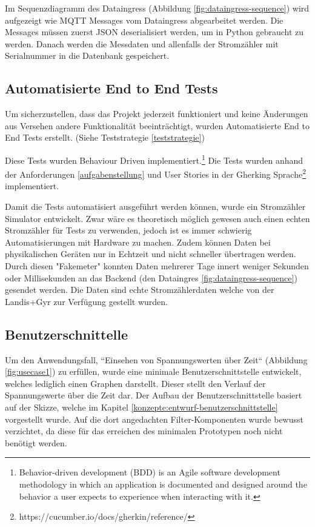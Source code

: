 Im Sequenzdiagramm des Dataingress (Abbildung \ref{fig:dataingress-sequence}) wird aufgezeigt
wie \ac{MQTT} Messages vom Dataingress abgearbeitet werden.
Die Messages müssen zuerst \ac{JSON} deserialisiert werden, um in Python
gebraucht zu werden. Danach werden die Messdaten und allenfalls der
Stromzähler mit Serialnummer in die Datenbank gespeichert.

\subsection{Automatisierte End to End Tests}

Um sicherzustellen, dass das Projekt jederzeit funktioniert und keine Änderungen
aus Versehen andere Funktionalität beeinträchtigt, wurden Automatisierte
End to End Tests erstellt. (Siehe Teststrategie \ref{teststrategie})

Diese Tests wurden Behaviour Driven implementiert.\footnote{
    Behavior-driven development (BDD) is an Agile software development methodology
    in which an application is documented and designed around the behavior a user
    expects to experience when interacting with it.
}\parencite{what_is_bdd} Die Tests wurden anhand der Anforderungen \ref{aufgabenstellung}
und User Stories in der Gherking Sprache\footnote{https://cucumber.io/docs/gherkin/reference/} implementiert.

Damit die Tests automatisiert ausgeführt werden können, wurde ein Stromzähler Simulator entwickelt.
Zwar wäre es theoretisch möglich gewesen auch einen echten Stromzähler für Tests zu verwenden,
jedoch ist es immer schwierig Automatisierungen mit Hardware zu machen. Zudem können
Daten bei physikalischen Geräten nur in Echtzeit und nicht schneller übertragen werden.
Durch diesen "Fakemeter" konnten Daten mehrerer Tage innert weniger Sekunden oder Millisekunden
an das Backend (den Dataingres \ref{fig:dataingress-sequence}) gesendet werden.
Die Daten sind echte Stromzählerdaten welche von der Landis+Gyr zur Verfügung
gestellt wurden.

\subsection{Benutzerschnittelle}
Um den Anwendungsfall, ``Einsehen von Spannungswerten über Zeit`` (Abbildung \ref{fig:usecase1}) zu erfüllen,
wurde eine minimale Benutzerschnittstelle entwickelt, welches lediglich einen Graphen darstellt.
Dieser stellt den Verlauf der Spannungswerte über die Zeit dar.
Der Aufbau der Benutzerschnittstelle basiert auf der Skizze,
welche im Kapitel \ref{konzepte:entwurf-benutzerschnittstelle} vorgestellt wurde.
Auf die dort angedachten Filter-Komponenten wurde bewusst verzichtet, da diese für das erreichen des
minimalen Prototypen noch nicht benötigt werden.


